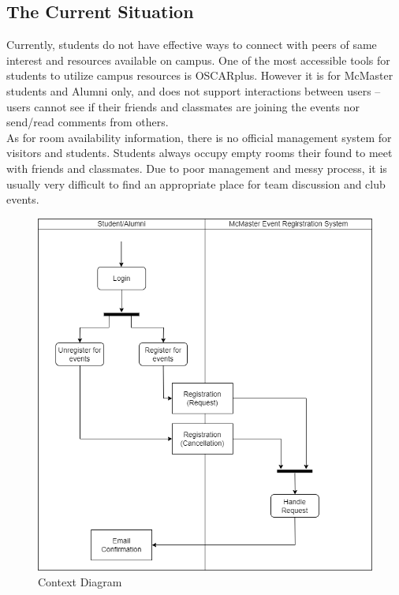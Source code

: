 \documentclass[12pt]{article}
\begin{document}
\subsection{The Current Situation}
Currently, students do not have effective ways to connect with peers of same interest and resources available on campus.  One of the most accessible tools for students to utilize campus resources is OSCARplus. However it is for McMaster students and Alumni only,  and does not support interactions between users -- users cannot see if their friends and classmates are joining the events nor send/read comments from others. \\
As for room availability information,  there is no official management system for visitors and students.  Students always occupy empty rooms their found to meet with friends and classmates.  Due to poor management and messy process,  it is usually very difficult to find an appropriate place for team discussion and club events.
\begin{figure}[H]
\begin{center}
\includegraphics[scale=0.5]{Current_Situation.png}
\end{center}
\caption{Context Diagram}
\end{figure}
\end{document}
